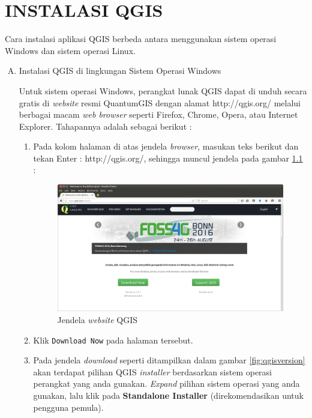 \chapter{INSTALASI QGIS}

Cara instalasi aplikasi QGIS berbeda antara menggunakan sistem operasi Windows dan sistem operasi Linux.

\begin{enumerate}[A.]

\item Instalasi QGIS di lingkungan Sistem Operasi Windows

Untuk sistem operasi Windows, perangkat lunak QGIS dapat di unduh secara gratis di \textit{website} resmi QuantumGIS dengan alamat http://qgis.org/ melalui berbagai macam \textit{web browser} seperti Firefox, Chrome, Opera, atau Internet Explorer. Tahapannya adalah sebagai berikut :

\begin{enumerate}[1.]

\item Pada kolom halaman di atas jendela \textit{browser}, masukan teks berikut dan tekan Enter : http://qgis.org/, sehingga muncul jendela pada gambar \ref{fig:qgishomepage} :

\begin{figure}[H]
  \centering
  \includegraphics[width=1\textwidth]{./resources/001-homepage-qgis}
  \caption{Jendela \textit{website} QGIS}
  \label{fig:qgishomepage}
\end{figure}

\item Klik \verb|Download Now| pada halaman tersebut.

\item Pada jendela \textit{download} seperti ditampilkan dalam gambar \ref{fig:qgisversion} akan terdapat pilihan QGIS \textit{installer} berdasarkan sistem operasi perangkat yang anda gunakan. \textit{Expand} pilihan sistem operasi yang anda gunakan, lalu klik pada \textbf{Standalone Installer} (direkomendasikan untuk pengguna pemula).


\end{enumerate}
\end{enumerate}
